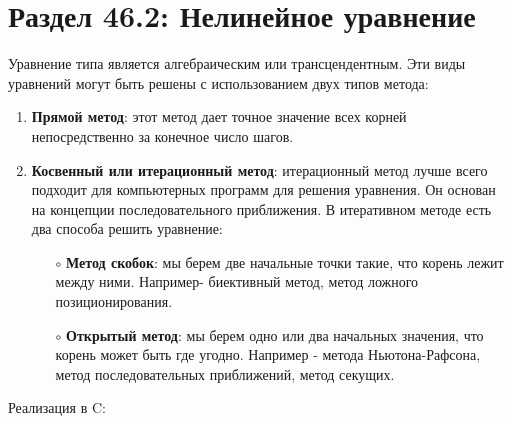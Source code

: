\section*{Раздел 46.2: Нелинейное уравнение}
Уравнение типа  является алгебраическим или трансцендентным. Эти
виды уравнений могут быть решены с использованием двух типов метода:
\begin{enumerate}
    \item \textbf{Прямой метод}: этот метод дает точное значение всех корней
непосредственно за конечное число шагов.
    \item \textbf{Косвенный или итерационный метод}: итерационный метод лучше всего
подходит для компьютерных программ для решения уравнения. Он основан
на концепции последовательного приближения. В итеративном методе есть
два способа решить уравнение:
    \begin{itemize}
        \item[$\circ$]\textbf{Метод скобок}: мы берем две начальные точки такие, что корень лежит между ними. Например- биективный метод, метод ложного позиционирования.
        \item[$\circ$]\textbf{Открытый метод}: мы берем одно или два начальных значения, что корень
может быть где угодно. Например - метода Ньютона-Рафсона, метод
последовательных приближений, метод секущих.
    \end{itemize}
\end{enumerate}
\vspace{\baselineskip}
Реализация в C:
\vspace{\baselineskip}
\vspace{\baselineskip}
